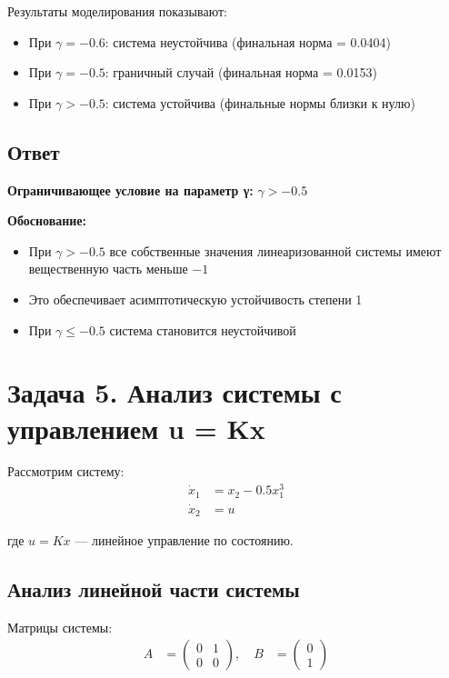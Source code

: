 Результаты моделирования показывают:
\begin{itemize}
\item При $\gamma = -0.6$: система неустойчива (финальная норма = 0.0404)
\item При $\gamma = -0.5$: граничный случай (финальная норма = 0.0153)
\item При $\gamma > -0.5$: система устойчива (финальные нормы близки к нулю)
\end{itemize}

\subsection*{Ответ}

\textbf{Ограничивающее условие на параметр γ:} $\gamma > -0.5$

\textbf{Обоснование:}
\begin{itemize}
\item При $\gamma > -0.5$ все собственные значения линеаризованной системы имеют вещественную часть меньше $-1$
\item Это обеспечивает асимптотическую устойчивость степени 1
\item При $\gamma \leq -0.5$ система становится неустойчивой
\end{itemize}

\section*{Задача 5. Анализ системы с управлением u = Kx}

Рассмотрим систему:
\begin{align}
\dot{x}_1 &= x_2 - 0.5x_1^3 \\
\dot{x}_2 &= u
\end{align}

где $u = Kx$ — линейное управление по состоянию.

\subsection*{Анализ линейной части системы}

Матрицы системы:
\begin{align}
A &= \begin{pmatrix} 0 & 1 \\ 0 & 0 \end{pmatrix}, \quad
B &= \begin{pmatrix} 0 \\ 1 \end{pmatrix}
\end{align}

